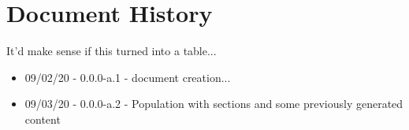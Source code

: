 \chapter{Document History}
It'd make sense if this turned into a table...

\begin{itemize}
\item 09/02/20 -  0.0.0-a.1 - document creation...
\item 09/03/20 -  0.0.0-a.2 - Population with sections and some previously generated content
\end{itemize}